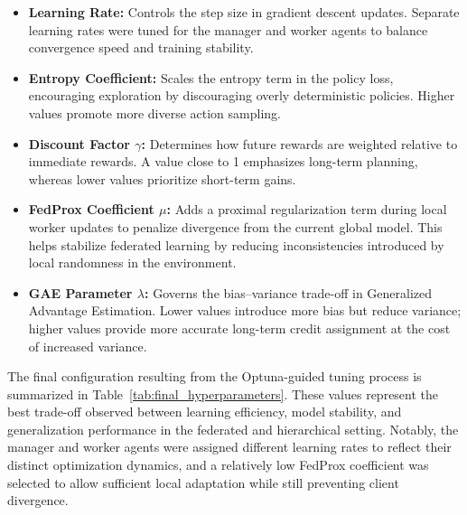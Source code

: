 \documentclass[12pt,a4paper,twoside,openany]{book}
\begin{document}
\begin{itemize}
\begin{itemize}
  \item \textbf{Learning Rate:} Controls the step size in gradient descent updates. Separate learning rates were tuned for the manager and worker agents to balance convergence speed and training stability.
  
  \item \textbf{Entropy Coefficient:} Scales the entropy term in the policy loss, encouraging exploration by discouraging overly deterministic policies. Higher values promote more diverse action sampling.

  \item \textbf{Discount Factor $\gamma$:} Determines how future rewards are weighted relative to immediate rewards. A value close to 1 emphasizes long-term planning, whereas lower values prioritize short-term gains.

  \item \textbf{FedProx Coefficient $\mu$:} Adds a proximal regularization term during local worker updates to penalize divergence from the current global model. This helps stabilize federated learning by reducing inconsistencies introduced by local randomness in the environment.

  \item \textbf{GAE Parameter $\lambda$:} Governs the bias–variance trade-off in Generalized Advantage Estimation. Lower values introduce more bias but reduce variance; higher values provide more accurate long-term credit assignment at the cost of increased variance.
\end{itemize}

The final configuration resulting from the Optuna-guided tuning process is summarized in Table~\ref{tab:final_hyperparameters}. These values represent the best trade-off observed between learning efficiency, model stability, and generalization performance in the federated and hierarchical setting. Notably, the manager and worker agents were assigned different learning rates to reflect their distinct optimization dynamics, and a relatively low FedProx coefficient was selected to allow sufficient local adaptation while still preventing client divergence.


\end{itemize}
\end{document}
